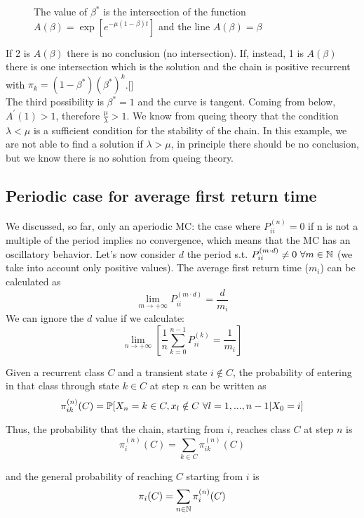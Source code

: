 	\begin{figure}[h!]
		
		\caption{The value of $\beta^*$ is the intersection of the function $A(\beta)=\exp\left[e^{-\mu(1-\beta)t}\right]$ and the line $A(\beta)=\beta$}
		\label{fig:cBetaK}
	\end{figure}
	If 2 is $A(\beta)$ there is no conclusion (no intersection). If, instead, 1 is $A(\beta)$ there is one intersection which is the solution and the chain is positive recurrent with $\pi_k = (1-\beta^*)(\beta^*)^k$.[]\\
	The third possibility is $\beta^* = 1$ and the curve is tangent. Coming from below, $A^{'}(1)>1$, therefore $\frac{\mu}{\lambda}>1$. We know from queing theory that the condition $\lambda < \mu$ is a sufficient condition for the stability of the chain. In this example, we are not able to find a solution if $\lambda > \mu$, in principle there should be no conclusion, but we know there is no solution from queing theory.

\subsection*{Periodic case for average first return time}
We discussed, so far, only an aperiodic MC: the case where $P_{ii}^{(n)}=0$ if n is not a multiple of the period implies no convergence, which means that the MC has an oscillatory behavior. Let's now consider $d$ the period s.t. $P_{ii}^{(m \cdot d)}\neq 0~\forall m\in \mathbb{N} $ (we take into account only positive values). The average first return time ($m_i$) can be calculated as
\begin{equation}
	\lim_{m\to+\infty} P_{ii}^{(m \cdot d)} = \frac{d}{m_i}
\end{equation}
We can ignore the $d$ value if we calculate:
\begin{equation}
	\lim_{n\to+\infty}\left[\frac{1}{n}\sum\limits_{k=0}^{n-1} P_{ii}^{(k)} = \frac{1}{m_i}\right]
\end{equation}
	\begin{definition}[lesson 22/03/17] \label{def:falling_probability}
		Given a recurrent class $C$ and a transient state $i \notin C$, the probability of entering in that class through state $k \in C$ at step $n$ can be written as
		$$ \pi_{ik}^{(n)}(C) = \mathbb{P}[X_n = k \in C, x_l \notin C ~ \forall l=1, ..., n-1 | X_0 = i] $$

		Thus, the probability that the chain, starting from $i$, reaches class $C$ at step $n$ is
		$$ \pi_{i}^{(n)}(C) = \sum_{k \in C} \pi_{ik}^{(n)}(C) $$

		and the general probability of reaching $C$ starting from $i$ is
		$$ \pi_i(C) = \sum_{n \in \mathbb{N}} \pi_i^{(n)}(C) $$
	\end{definition}

